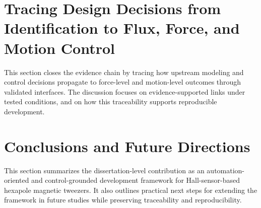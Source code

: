 \section{Tracing Design Decisions from Identification to Flux, Force, and Motion Control}

This section closes the evidence chain by tracing how upstream modeling and control decisions propagate to force-level and motion-level outcomes through validated interfaces. The discussion focuses on evidence-supported links under tested conditions, and on how this traceability supports reproducible development.

\section{Conclusions and Future Directions}

This section summarizes the dissertation-level contribution as an automation-oriented and control-grounded development framework for Hall-sensor-based hexapole magnetic tweezers. It also outlines practical next steps for extending the framework in future studies while preserving traceability and reproducibility.
